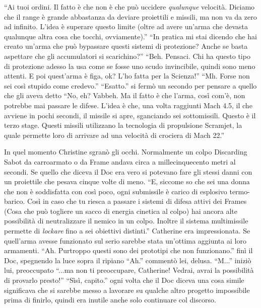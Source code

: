     ``Ai tuoi ordini. Il fatto è che non è che può uccidere \emph{qualunque} velocità. Diciamo che il range è grande
    abbastanza da deviare proiettili e missili, ma non va da zero ad infinito. L'idea è superare questo limite (oltre ad
    avere un'arma che devasta qualunque altra cosa che tocchi, ovviamente).'' ``In pratica mi stai dicendo che hai
    creato un'arma che può bypassare questi sistemi di protezione? Anche se basta aspettare che gli accumulatori si
    scarichino?'' ``Beh. Pensaci. Chi ha questo tipo di protezione adesso la usa come se fosse uno scudo invincibile,
    quindi sono meno attenti. E poi quest'arma è figa, ok? L'ho fatta per la Scienza!'' ``Mh. Forse non sei così
    stupido come credevo.'' ``Esatto.'' si fermò un secondo per pensare a quello che gli aveva detto ``No, eh? Vabbeh.
    Ma il fatto è che l'arma, così com'è, non potrebbe mai passare le difese. L'idea è che, una volta raggiunti Mach
    4.5, il che avviene in pochi secondi, il missile si apre, sganciando sei sottomissili. Questo è il terzo stage.
    Questi missili utilizzano la tecnologia di propulsione Scramjet, la quale permette loro di arrivare ad una velocità
    di crociera di Mach 22.''

    In quel momento Christine sgranò gli occhi. Normalmente un colpo Discarding Sabot da carroarmato o da Frame andava
    circa a millecinquecento metri al secondi. Se quello che diceva il Doc era vero si potevano fare gli stessi danni
    con un proiettile che pesava cinque volte di meno. ``E, siccome so che sei una donna che non è soddisfatta con così
    poco, ogni submissile è carico di esplosivo termo-barico. Così in caso che tu riesca a passare i sistemi di difesa
    attivi dei Frames (Cosa che può togliere un sacco di energia cinetica al colpo) hai ancora alte possibilità di
    neutralizzare il nemico in un colpo. Inoltre il sistema multimissile permette di \emph{lockare} fino a sei obiettivi
    distinti.'' Catherine era impressionata. Se quell'arma avesse funzionato sul serio sarebbe stata un'ottima aggiunta
    ai loro armamenti. ``Ah. Purtroppo questi sono dei prototipi che non funzionano.'' finì il Doc, spegnendo la luce
    sopra il ripiano ``Ah.'' commentò lei, delusa. ``M...'' iniziò lui, preoccupato ``...ma non ti preoccupare,
    Catherine! Vedrai, avrai la possibilità di provarlo presto!'' ``Sìsì, capito.'' ogni volta che il Doc diceva una
    cosa simile significava che si sarebbe messo a lavorare su qualche altro progetto impossibile prima di finirlo,
    quindi era inutile anche solo continuare col discorso.
    
